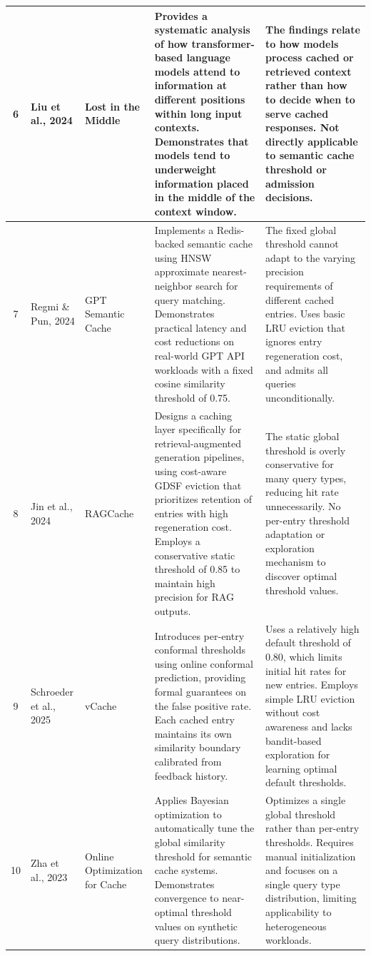 \documentclass[12pt,a4paper]{report}
\begin{document}
\begin{longtable}{|c|p{2.5cm}|p{2.5cm}|p{4cm}|p{4cm}|}
\hline
6 & Liu et al., 2024 & Lost in the Middle & Provides a systematic analysis of how transformer-based language models attend to information at different positions within long input contexts. Demonstrates that models tend to underweight information placed in the middle of the context window. & The findings relate to how models process cached or retrieved context rather than how to decide when to serve cached responses. Not directly applicable to semantic cache threshold or admission decisions. \\
\hline
7 & Regmi \& Pun, 2024 & GPT Semantic Cache & Implements a Redis-backed semantic cache using HNSW approximate nearest-neighbor search for query matching. Demonstrates practical latency and cost reductions on real-world GPT API workloads with a fixed cosine similarity threshold of 0.75. & The fixed global threshold cannot adapt to the varying precision requirements of different cached entries. Uses basic LRU eviction that ignores entry regeneration cost, and admits all queries unconditionally. \\
\hline
8 & Jin et al., 2024 & RAGCache & Designs a caching layer specifically for retrieval-augmented generation pipelines, using cost-aware GDSF eviction that prioritizes retention of entries with high regeneration cost. Employs a conservative static threshold of 0.85 to maintain high precision for RAG outputs. & The static global threshold is overly conservative for many query types, reducing hit rate unnecessarily. No per-entry threshold adaptation or exploration mechanism to discover optimal threshold values. \\
\hline
9 & Schroeder et al., 2025 & vCache & Introduces per-entry conformal thresholds using online conformal prediction, providing formal guarantees on the false positive rate. Each cached entry maintains its own similarity boundary calibrated from feedback history. & Uses a relatively high default threshold of 0.80, which limits initial hit rates for new entries. Employs simple LRU eviction without cost awareness and lacks bandit-based exploration for learning optimal default thresholds. \\
\hline
10 & Zha et al., 2023 & Online Optimization for Cache & Applies Bayesian optimization to automatically tune the global similarity threshold for semantic cache systems. Demonstrates convergence to near-optimal threshold values on synthetic query distributions. & Optimizes a single global threshold rather than per-entry thresholds. Requires manual initialization and focuses on a single query type distribution, limiting applicability to heterogeneous workloads. \\

\end{longtable}
\end{document}
